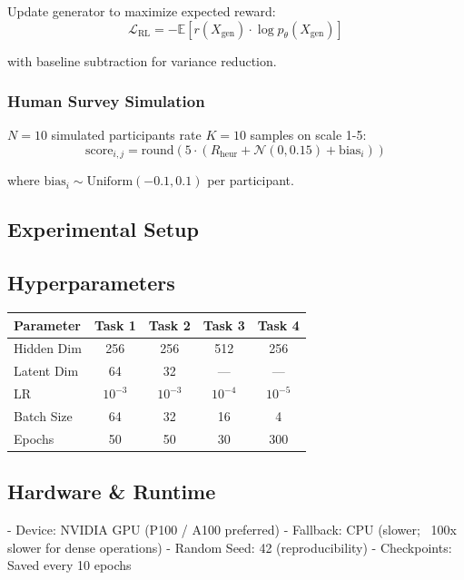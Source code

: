\documentclass[conference]{IEEEtran}
\begin{document}
Update generator to maximize expected reward:
\begin{equation}
\mathcal{L}_{\text{RL}} = -\mathbb{E}[r(X_{\text{gen}}) \cdot \log p_\theta(X_{\text{gen}})]
\end{equation}

with baseline subtraction for variance reduction.

\subsubsection{Human Survey Simulation}
$N=10$ simulated participants rate $K=10$ samples on scale 1-5:
\begin{equation}
\text{score}_{i,j} = \text{round}(5 \cdot (R_{\text{heur}} + \mathcal{N}(0, 0.15) + \text{bias}_i))
\end{equation}

where $\text{bias}_i \sim \text{Uniform}(-0.1, 0.1)$ per participant.

\subsection{Experimental Setup}
\label{subsec:setup}

\subsection{Hyperparameters}

\begin{table}[h]
\centering
\begin{tabular}{lcccc}
\toprule
Parameter & Task 1 & Task 2 & Task 3 & Task 4 \\
\midrule
Hidden Dim & 256 & 256 & 512 & 256 \\
Latent Dim & 64 & 32 & — & — \\
LR & $10^{-3}$ & $10^{-3}$ & $10^{-4}$ & $10^{-5}$ \\
Batch Size & 64 & 32 & 16 & 4 \\
Epochs & 50 & 50 & 30 & 300 \\
\bottomrule
\end{tabular}
\end{table}

\subsection{Hardware \& Runtime}
- Device: NVIDIA GPU (P100 / A100 preferred)
- Fallback: CPU (slower; ~100x slower for dense operations)
- Random Seed: 42 (reproducibility)
- Checkpoints: Saved every 10 epochs
\end{document}
